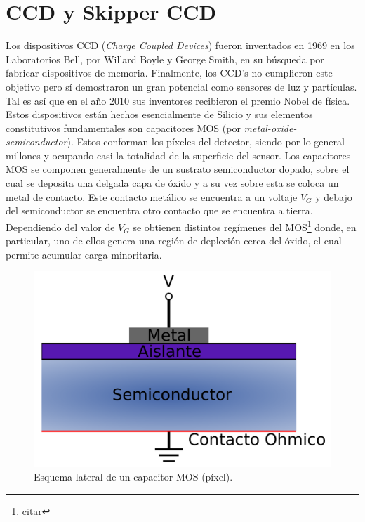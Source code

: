 \section{CCD y Skipper CCD}
\noindent Los dispositivos CCD (\textit{Charge Coupled Devices}) fueron inventados en 1969 en los Laboratorios Bell, por Willard Boyle y George Smith, en su búsqueda por fabricar dispositivos de memoria. Finalmente, los CCD's no cumplieron este objetivo pero sí demostraron un gran potencial como sensores de luz y partículas. Tal es así que en el año 2010 sus inventores recibieron el premio Nobel de física\cite{Boyle}\cite{Smith}.\\
\indent Estos dispositivos están hechos esencialmente de Silicio y sus elementos constitutivos fundamentales son capacitores MOS (por \textit{metal-oxide-semiconductor}). Estos conforman los píxeles del detector, siendo por lo general millones y ocupando casi la totalidad de la superficie del sensor. Los capacitores MOS se componen generalmente de un sustrato semiconductor dopado, sobre el cual se deposita una delgada capa de óxido y a su vez sobre esta se coloca un metal de contacto. Este contacto metálico se encuentra a un voltaje $V_{G}$ y debajo del semiconductor se encuentra otro contacto que se encuentra a tierra. Dependiendo del valor de $V_{G}$ se obtienen distintos regímenes del MOS\footnote{citar} donde, en particular, uno de ellos genera una región de depleción cerca del óxido, el cual permite acumular carga minoritaria.\\
\begin{figure}%
    \centering
        \includegraphics[scale=.35]{Figs/PixelCrossSection.pdf}
    \caption{\footnotesize{Esquema lateral de un capacitor MOS (píxel).}}
    \label{fig:PixelCrossSection}
\end{figure}
